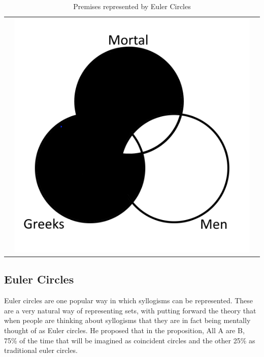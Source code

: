 \documentclass[12pt,a4paper]{report}
\begin{document}
\begin{table}[htb]
\begin{tabular}{ c  c  c }
\begin{minipage}{.29\textwidth}
    \end{minipage}
    & 
    \begin{minipage}{.29\textwidth}
      \includegraphics[scale=0.25]{VennAllGreeksAreMortal}
    \end{minipage}
    \\
  \end{tabular}
  \caption{Premises represented by Euler Circles}\label{tbl:eulerPremises}
\end{table}
\FloatBarrier



\subsection{Euler Circles}
Euler circles are one popular way in which syllogisms can be represented. 
These are a very natural way of representing sets, with \cite{Erickson1978-ERIROS} putting forward the theory that when people are thinking about syllogisms that they are in fact being mentally thought of as Euler circles. He proposed that in the proposition, All A are B, 75\% of the time that will be imagined as coincident circles and the other 25\% as traditional euler circles.
\end{document}
